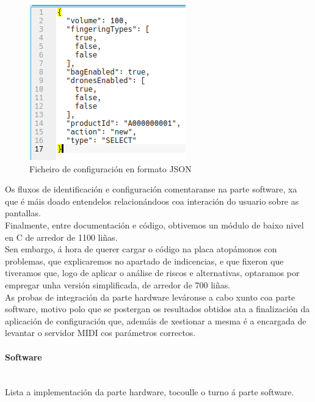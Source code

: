    \begin{figure}[htbp]
    \centering
    \includegraphics[scale=0.6, keepaspectratio=true]{./imagenes/ficheiro-json.png}
    \caption{Ficheiro de configuración en formato JSON}
    \label{figura:FicheiroJson}
   \end{figure}
   
   Os fluxos de identificación e configuración comentaranse na parte software,
   xa que é máis doado entendelos relacionándoos coa interación do usuario sobre
   as pantallas. \\
   
   Finalmente, entre documentación e código, obtivemos un módulo de baixo nivel
   en C de arredor de 1100 liñas. \\
   
   Sen embargo, á hora de querer cargar o código na placa atopámonos con
   problemas, que explicaremos no apartado de indicencias, e que fixeron que
   tiveramos que, logo de aplicar o análise de riscos e alternativas, optaramos
   por empregar unha versión simplificada, de arredor de 700 liñas. \\
   
   As probas de integración da parte hardware leváronse a cabo xunto coa parte
   software, motivo polo que se postergan os resultados obtidos ata a
   finalización da aplicación de configuración que, ademáis de xestionar a mesma
   é a encargada de levantar o servidor MIDI cos parámetros correctos.
   
   \paragraph{Software}\mbox{}\\
   
   Lista a implementación da parte hardware, tocoulle o turno á parte
   software. \\
   

